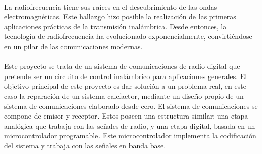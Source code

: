 \paragraph{}
La radiofrecuencia tiene sus raíces en el descubrimiento de las ondas electromagnéticas. 
Este hallazgo hizo posible la realizaci\'on de las primeras aplicaciones prácticas de la transmisión inalámbrica.
Desde entonces, la tecnología de radiofrecuencia ha evolucionado exponencialmente, convirtiéndose en un pilar de las comunicaciones modernas.
\paragraph{}
Este proyecto se trata de un sistema de comunicaciones de radio digital que pretende ser un circuito de control inalámbrico para aplicaciones generales. 
El objetivo principal de este proyecto es dar solución a un problema real, en este caso la reparación de un sistema calefactor, mediante un diseño propio de un sistema de comunicaciones elaborado desde cero.
El sistema de comunicaciones se compone de emisor y receptor. Estos poseen una estructura similar: una etapa analógica que trabaja con las señales de radio, y una etapa digital, basada en un microcontrolador programable. Este microcontrolador implementa la codificación del sistema y trabaja con las señales en banda base.
